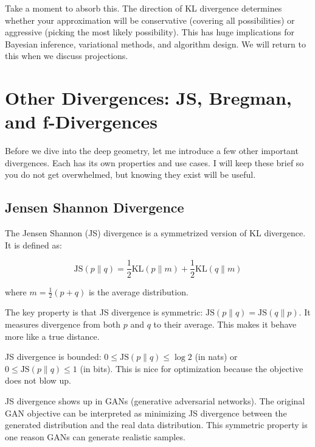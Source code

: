 \vspace{1.5em}

Take a moment to absorb this. The direction of KL divergence determines whether your approximation will be conservative (covering all possibilities) or aggressive (picking the most likely possibility). This has huge implications for Bayesian inference, variational methods, and algorithm design. We will return to this when we discuss projections.

\vspace{2em}

\section{Other Divergences: JS, Bregman, and f-Divergences}

Before we dive into the deep geometry, let me introduce a few other important divergences. Each has its own properties and use cases. I will keep these brief so you do not get overwhelmed, but knowing they exist will be useful.

\vspace{1.5em}

\subsection{Jensen Shannon Divergence}

The Jensen Shannon (JS) divergence is a symmetrized version of KL divergence. It is defined as:

\begin{equation}
\text{JS}(p \| q) = \frac{1}{2}\text{KL}(p \| m) + \frac{1}{2}\text{KL}(q \| m)
\end{equation}

where $m = \frac{1}{2}(p + q)$ is the average distribution.

\vspace{1em}

The key property is that JS divergence is symmetric: $\text{JS}(p \| q) = \text{JS}(q \| p)$. It measures divergence from both $p$ and $q$ to their average. This makes it behave more like a true distance.

JS divergence is bounded: $0 \leq \text{JS}(p \| q) \leq \log 2$ (in nats) or $0 \leq \text{JS}(p \| q) \leq 1$ (in bits). This is nice for optimization because the objective does not blow up.

JS divergence shows up in GANs (generative adversarial networks). The original GAN objective can be interpreted as minimizing JS divergence between the generated distribution and the real data distribution. This symmetric property is one reason GANs can generate realistic samples.

